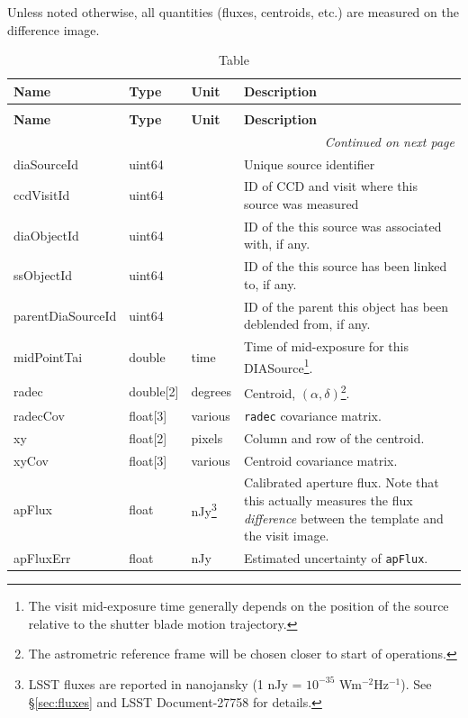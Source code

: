 \documentclass[SE,lsstdraft,toc]{lsstdoc}
\newenvironment{schema}[3]{%
\setlength\LTleft{0pt}
\setlength\LTright{\fill}
\begin{longtable}{p{0.2\textwidth}p{0.14\textwidth}p{0.14\textwidth}p{0.41\textwidth}}

\caption[#1]{#2\label{#3}}\\

\hline \textbf{Name} & \textbf{Type} & \textbf{Unit} & \textbf{Description}\\ \hline
\endfirsthead

\caption[#1]{#2}\\

\hline \textbf{Name} & \textbf{Type} & \textbf{Unit} & \textbf{Description}\\ \hline
\endhead

\hline \multicolumn{4}{r}{\emph{Continued on next page}} \\
\endfoot

\hline\hline
\endlastfoot
}{%
\hline
\end{longtable}
}
\begin{document}
Unless noted otherwise, all \DIASource quantities (fluxes, centroids, etc.) are measured on the difference image.


\begin{schema}{\DIASource Table}{\DIASource Table}{tbl:diasourceTable}

diaSourceId & uint64 & ~ & Unique source identifier \\

ccdVisitId & uint64 & ~ & ID of CCD and visit where this source was measured \\

diaObjectId & uint64 & ~ & ID of the \DIAObject this source was associated with, if any. \\

ssObjectId & uint64 & ~ & ID of the \SSObject this source has been linked to, if any. \\

parentDiaSourceId & uint64 & ~ & ID of the parent \DIASource this object has been deblended from, if any. \\

midPointTai & double & time & Time of mid-exposure for this DIASource\footnote{The visit mid-exposure
time generally depends on the position of the source relative to the shutter blade motion trajectory.}. \\

radec & double[2] & degrees & Centroid, $(\alpha, \delta)$\footnote{The astrometric reference frame will be chosen closer to start of operations.}. \\

radecCov & float[3] & various & \texttt{radec} covariance matrix. \\

xy & float[2] & pixels & Column and row of the centroid. \\

xyCov & float[3] & various & Centroid covariance matrix. \\

apFlux & float & nJy\footnote{LSST fluxes are reported in nanojansky (1 nJy = $10^{−35}$ Wm$^{−2}$Hz$^{−1}$).
See \S \ref{sec:fluxes} and LSST Document-27758 for details.} & Calibrated aperture flux. Note that this actually measures
the flux \emph{difference} between the template and the visit image. \\

apFluxErr & float & nJy &  Estimated uncertainty of \texttt{apFlux}. \\


\end{schema}
\end{document}
